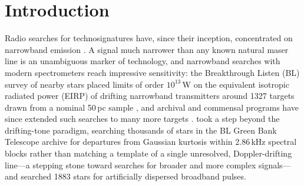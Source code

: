 \documentclass[linenumbers]{aastex702}
\begin{document}
\section{Introduction} \label{sec:intro}

Radio searches for technosignatures have, since their inception, concentrated on narrowband emission \citep[e.g.,][]{Tarter2001}. A signal much narrower than any known natural maser line is an unambiguous marker of technology, and narrowband searches with modern spectrometers reach impressive sensitivity: the Breakthrough Listen (BL) survey of nearby stars \citep{Isaacson2017} placed limits of order $10^{13}$\,W \citep[including the correction of][]{Choza2024} on the equivalent isotropic radiated power (EIRP) of drifting narrowband transmitters around 1327 targets drawn from a nominal 50\,pc sample \citep{Price2020}, and archival and commensal programs have since extended such searches to many more targets \citep[e.g.,][]{Tremblay2025}. \citet{Painter2025} took a step beyond the drifting-tone paradigm, searching thousands of stars in the BL Green Bank Telescope archive for departures from Gaussian kurtosis within 2.86\,kHz spectral blocks rather than matching a template of a single unresolved, Doppler-drifting line---a stepping stone toward searches for broader and more complex signals---and \citet{Gajjar2022} searched 1883 stars for artificially dispersed broadband pulses.
\end{document}
